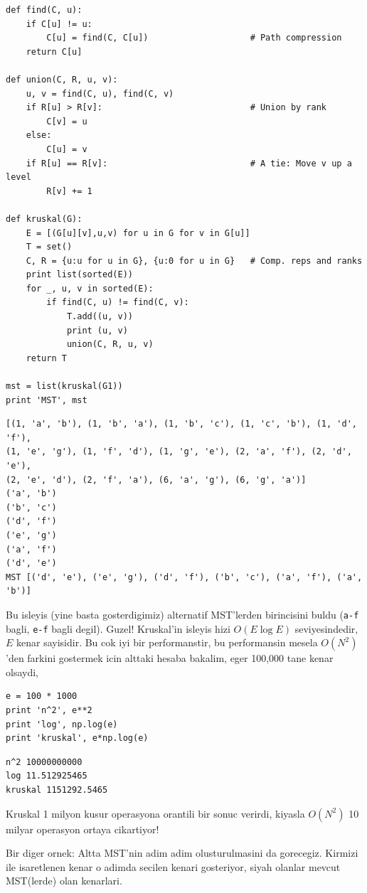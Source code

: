 \documentclass[12pt,fleqn]{article}\usepackage{../common}
\begin{document}
\begin{verbatim}
def find(C, u):
    if C[u] != u:
        C[u] = find(C, C[u])                    # Path compression
    return C[u]

def union(C, R, u, v):
    u, v = find(C, u), find(C, v)
    if R[u] > R[v]:                             # Union by rank
        C[v] = u
    else:
        C[u] = v
    if R[u] == R[v]:                            # A tie: Move v up a level
        R[v] += 1

def kruskal(G):
    E = [(G[u][v],u,v) for u in G for v in G[u]]
    T = set()
    C, R = {u:u for u in G}, {u:0 for u in G}   # Comp. reps and ranks
    print list(sorted(E))
    for _, u, v in sorted(E):
        if find(C, u) != find(C, v):
            T.add((u, v))
            print (u, v)
            union(C, R, u, v)
    return T

mst = list(kruskal(G1))
print 'MST', mst
\end{verbatim}

\begin{verbatim}
[(1, 'a', 'b'), (1, 'b', 'a'), (1, 'b', 'c'), (1, 'c', 'b'), (1, 'd', 'f'),
(1, 'e', 'g'), (1, 'f', 'd'), (1, 'g', 'e'), (2, 'a', 'f'), (2, 'd', 'e'),
(2, 'e', 'd'), (2, 'f', 'a'), (6, 'a', 'g'), (6, 'g', 'a')] 
('a', 'b')
('b', 'c')
('d', 'f')
('e', 'g')
('a', 'f')
('d', 'e')
MST [('d', 'e'), ('e', 'g'), ('d', 'f'), ('b', 'c'), ('a', 'f'), ('a',
'b')] 
\end{verbatim}

Bu isleyis (yine basta gosterdigimiz) alternatif MST'lerden birincisini
buldu (\verb!a-f! bagli, \verb!e-f! bagli degil). Guzel! Kruskal'in isleyis
hizi $O(E \log E)$ seviyesindedir, $E$ kenar sayisidir. Bu cok iyi bir
performanstir, bu performansin mesela $O(N^2)$'den farkini gostermek icin
alttaki hesaba bakalim, eger 100,000 tane kenar olsaydi,

\begin{verbatim}
e = 100 * 1000
print 'n^2', e**2
print 'log', np.log(e)
print 'kruskal', e*np.log(e)
\end{verbatim}

\begin{verbatim}
n^2 10000000000
log 11.512925465
kruskal 1151292.5465
\end{verbatim}

Kruskal 1 milyon kusur operasyona orantili bir sonuc verirdi, kiyasla
$O(N^2)$ 10 milyar operasyon ortaya cikartiyor! 

Bir diger ornek: Altta MST'nin adim adim olusturulmasini da
gorecegiz. Kirmizi ile isaretlenen kenar o adimda secilen kenari
gosteriyor, siyah olanlar mevcut MST(lerde) olan kenarlari.
\end{document}
